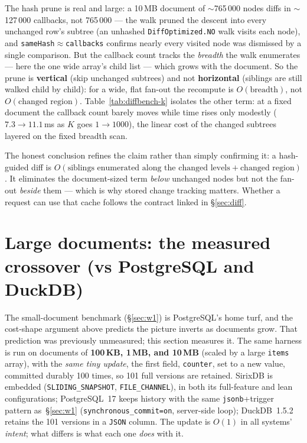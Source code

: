 \documentclass[11pt,a4paper,oneside]{report}
\theoremstyle{sirixthm}
\newcommand{\code}[1]{\texttt{#1}}
\begin{document}
The hash prune is real and large: a 10\,MB document of $\sim$765\,000 nodes diffs in $\sim$127\,000
callbacks, not 765\,000 --- the walk pruned the descent into every unchanged row's subtree (an unhashed
\code{DiffOptimized.NO} walk visits each node), and \code{sameHash}$\approx$\code{callbacks} confirms nearly
every visited node was dismissed by a single comparison. But the callback count tracks the \emph{breadth}
the walk enumerates --- here the one wide array's child list --- which grows with the document. So the
prune is \textbf{vertical} (skip unchanged subtrees) and not \textbf{horizontal} (siblings are still walked
child by child): for a wide, flat fan-out the recompute is $O(\text{breadth})$, not
$O(\text{changed region})$. Table~\ref{tab:diffbench-k} isolates the other term: at a fixed document the
callback count barely moves while time rises only modestly ($7.3\to11.1$\,ms as $K$ goes $1\to1000$), the
linear cost of the changed subtrees layered on the fixed breadth scan.

The honest conclusion refines the claim rather than simply confirming it: a hash-guided diff is
$O(\text{siblings enumerated along the changed levels} + \text{changed region})$. It eliminates the
document-sized term \emph{below} unchanged nodes but not the fan-out \emph{beside} them --- which is
why stored change tracking matters. Whether a request can use that cache follows the contract
linked in \S\ref{sec:diff}.

\section{Large documents: the measured crossover (vs PostgreSQL and DuckDB)}
\label{sec:crossover}

The small-document benchmark (\S\ref{sec:w1}) is PostgreSQL's home turf, and the cost-shape argument
above predicts the picture inverts as documents grow. That prediction was previously unmeasured; this
section measures it. The same harness is run on documents of \textbf{100\,KB, 1\,MB, and 10\,MB} (scaled
by a large \code{items} array), with the \emph{same tiny update}, the first field, \code{counter}, set
to a new value, committed durably 100 times, so 101 full versions are retained. SirixDB is embedded
(\code{SLIDING\_SNAPSHOT}, \code{FILE\_CHANNEL}), in both its full-feature and lean configurations;
PostgreSQL~17 keeps history with the same \code{jsonb}{+}trigger pattern as~\S\ref{sec:w1}
(\code{synchronous\_commit=on}, server-side loop); DuckDB~1.5.2 retains the 101 versions in a
\code{JSON} column. The update is $O(1)$ in all systems' \emph{intent}; what differs is what each one
\emph{does} with it.
\end{document}
